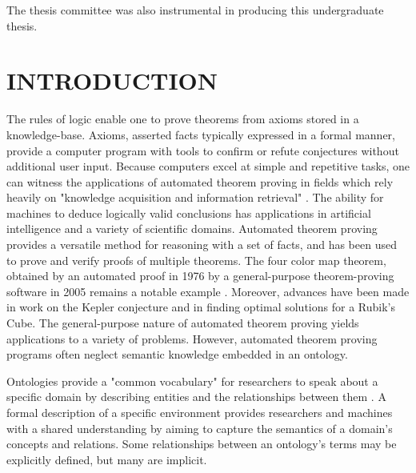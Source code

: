 \documentclass{article}
\makeatletter
\renewcommand\tableofcontents{
  \null\hfill\MakeUppercase{\contentsname}\hfill\null\par
  \hfill \break
  \@starttoc{toc}}
\makeatother
\begin{document}
The thesis committee was also instrumental in producing this undergraduate thesis.

\newpage
{}
\vspace*{.05in}
\listoffigures

\newpage
{}
\vspace*{.05in}
\listoftables

\newpage
{}
\tableofcontents

\newpage
{}
\setcounter{page}{1}
\vspace*{.05in}
\section{\MakeUppercase{Introduction}}

The rules of logic enable one to prove theorems from axioms stored in a knowledge-base. Axioms, asserted facts typically expressed in a formal manner, provide a computer program with tools to confirm or refute conjectures without additional user input. Because computers excel at simple and repetitive tasks, one can witness the applications of automated theorem proving in fields which rely heavily on "knowledge acquisition and information retrieval" \cite{sanchez2012ontology}. The ability for machines to deduce logically valid conclusions has applications in artificial intelligence and a variety of scientific domains. Automated theorem proving provides a versatile method for reasoning with a set of facts, and has been used to prove and verify proofs of multiple theorems. The four color map theorem, obtained by an automated proof in 1976 by a general-purpose theorem-proving software in 2005 remains a notable example \cite{gonthier2008formal}. Moreover, advances have been made in work on the Kepler conjecture and in finding optimal solutions for a Rubik's Cube. The general-purpose nature of automated theorem proving yields applications to a variety of problems. However, automated theorem proving programs often neglect semantic knowledge embedded in an ontology.

Ontologies provide a "common vocabulary" for researchers to speak about a specific domain by describing entities and the relationships between them \cite{noy2001ontology}. A formal description of a specific environment provides researchers and machines with a shared understanding by aiming to capture the semantics of a domain's concepts and relations. Some relationships between an ontology's terms may be explicitly defined, but many are implicit. 
\end{document}
